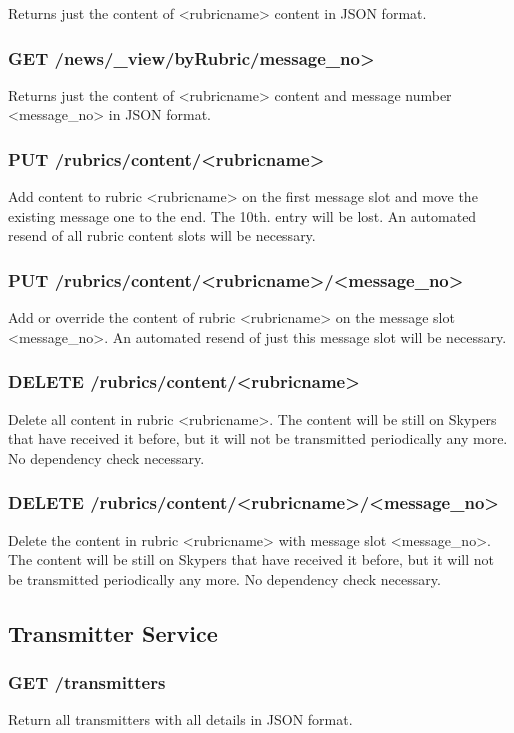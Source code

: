 Returns just the content of <rubricname> content in JSON format.

\subsubsection{GET /news/\_view/byRubric/message\_no>}
Returns just the content of <rubricname> content and message number <message\_no> in JSON format.

\subsubsection{PUT /rubrics/content/<rubricname>}
Add content to rubric <rubricname> on the first message slot and move the existing message one to the end. The 10th. entry will be lost. An automated resend of all rubric content slots will be necessary.

\subsubsection{PUT /rubrics/content/<rubricname>/<message\_no>}
Add or override the content of rubric <rubricname> on the message slot <message\_no>. An automated resend of just this message slot will be necessary.

\subsubsection{DELETE /rubrics/content/<rubricname>}
Delete all content in rubric <rubricname>. The content will be still on Skypers that have received it before, but it will not be transmitted periodically any more. No dependency check necessary.

\subsubsection{DELETE /rubrics/content/<rubricname>/<message\_no>}
Delete the content in rubric <rubricname> with message slot <message\_no>. The content will be still on Skypers that have received it before, but it will not be transmitted periodically any more. No dependency check necessary.

\subsection{Transmitter Service}

\subsubsection{GET /transmitters}
Return all transmitters with all details in JSON format.


